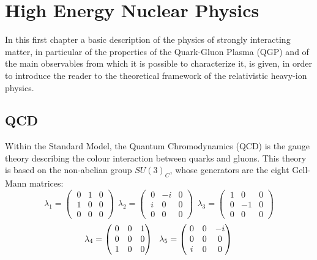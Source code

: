 \chapter{High Energy Nuclear Physics}
In this first chapter a basic description of the physics of strongly interacting matter, in particular of the properties of the Quark-Gluon Plasma (QGP) and of the main observables from which it is possible to characterize it, is given, in order to introduce the reader to the theoretical framework of the relativistic heavy-ion physics.
%
\section{QCD}
Within the Standard Model, the Quantum Chromodynamics (QCD) is the gauge theory describing the colour interaction between quarks and gluons. This theory is based on the non-abelian group $SU(3)_{C}$, whose generators are the eight Gell-Mann matrices:
%
\begin{equation*}
\lambda_{1} = 
  \begin{pmatrix}
     \ 0 & 1 & 0 \\
     \ 1 & 0 & 0 \\
     \ 0 & 0 & 0
   \end{pmatrix}
\ \ \lambda_{2} = 
  \begin{pmatrix}
     \ 0 & -i & 0 \\
     \ i & 0 & 0 \\
     \ 0 & 0 & 0
   \end{pmatrix}
\ \ \lambda_{3} = 
  \begin{pmatrix}
     \ 1 & 0 & 0 \\
     \ 0 & -1 & 0 \\
     \ 0 & 0 & 0
   \end{pmatrix}
\end{equation*}
\begin{equation}
\lambda_{4} = 
  \begin{pmatrix}
     \ 0 & 0 & 1 \\
     \ 0 & 0 & 0 \\
     \ 1 & 0 & 0
   \end{pmatrix}
\ \ \lambda_{5} = 
  \begin{pmatrix}
     \ 0 & 0 & -i \\
     \ 0 & 0 & 0 \\
     \ i & 0 & 0
   \end{pmatrix}
   \\
\end{equation}
